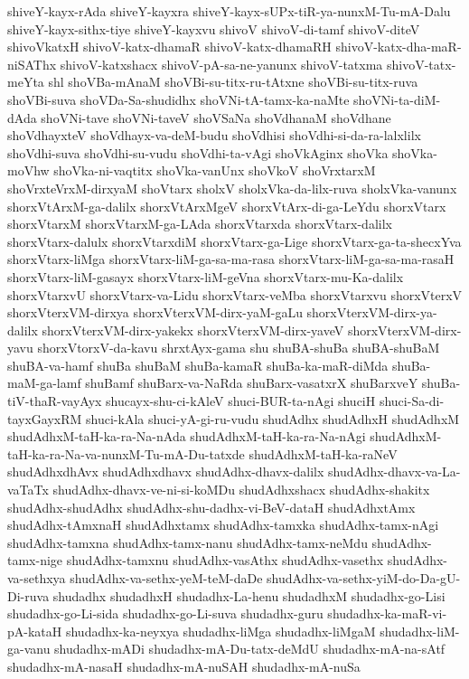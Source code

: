 {shiveY-kayx-rAda
shiveY-kayxra
shiveY-kayx-sUPx-tiR-ya-nunxM-Tu-mA-Dalu
shiveY-kayx-sithx-tiye
shiveY-kayxvu
shivoV
shivoV-di-tamf
shivoV-diteV
shivoVkatxH
shivoV-katx-dhamaR
shivoV-katx-dhamaRH
shivoV-katx-dha-maR-niSAThx
shivoV-katxshacx
shivoV-pA-sa-ne-yanunx
shivoV-tatxma
shivoV-tatx-meYta
shl
shoVBa-mAnaM
shoVBi-su-titx-ru-tAtxne
shoVBi-su-titx-ruva
shoVBi-suva
shoVDa-Sa-shudidhx
shoVNi-tA-tamx-ka-naMte
shoVNi-ta-diM-dAda
shoVNi-tave
shoVNi-taveV
shoVSaNa
shoVdhanaM
shoVdhane
shoVdhayxteV
shoVdhayx-va-deM-budu
shoVdhisi
shoVdhi-si-da-ra-lalxlilx
shoVdhi-suva
shoVdhi-su-vudu
shoVdhi-ta-vAgi
shoVkAginx
shoVka
shoVka-moVhw
shoVka-ni-vaqtitx
shoVka-vanUnx
shoVkoV
shoVrxtarxM
shoVrxteVrxM-dirxyaM
shoVtarx
sholxV
sholxVka-da-lilx-ruva
sholxVka-vanunx
shorxVtArxM-ga-dalilx
shorxVtArxMgeV
shorxVtArx-di-ga-LeYdu
shorxVtarx
shorxVtarxM
shorxVtarxM-ga-LAda
shorxVtarxda
shorxVtarx-dalilx
shorxVtarx-dalulx
shorxVtarxdiM
shorxVtarx-ga-Lige
shorxVtarx-ga-ta-shecxYva
shorxVtarx-liMga
shorxVtarx-liM-ga-sa-ma-rasa
shorxVtarx-liM-ga-sa-ma-rasaH
shorxVtarx-liM-gasayx
shorxVtarx-liM-geVna
shorxVtarx-mu-Ka-dalilx
shorxVtarxvU
shorxVtarx-va-Lidu
shorxVtarx-veMba
shorxVtarxvu
shorxVterxV
shorxVterxVM-dirxya
shorxVterxVM-dirx-yaM-gaLu
shorxVterxVM-dirx-ya-dalilx
shorxVterxVM-dirx-yakekx
shorxVterxVM-dirx-yaveV
shorxVterxVM-dirx-yavu
shorxVtorxV-da-kavu
shrxtAyx-gama
shu
shuBA-shuBa
shuBA-shuBaM
shuBA-va-hamf
shuBa
shuBaM
shuBa-kamaR
shuBa-ka-maR-diMda
shuBa-maM-ga-lamf
shuBamf
shuBarx-va-NaRda
shuBarx-vasatxrX
shuBarxveY
shuBa-tiV-thaR-vayAyx
shucayx-shu-ci-kAleV
shuci-BUR-ta-nAgi
shuciH
shuci-Sa-di-tayxGayxRM
shuci-kAla
shuci-yA-gi-ru-vudu
shudAdhx
shudAdhxH
shudAdhxM
shudAdhxM-taH-ka-ra-Na-nAda
shudAdhxM-taH-ka-ra-Na-nAgi
shudAdhxM-taH-ka-ra-Na-va-nunxM-Tu-mA-Du-tatxde
shudAdhxM-taH-ka-raNeV
shudAdhxdhAvx
shudAdhxdhavx
shudAdhx-dhavx-dalilx
shudAdhx-dhavx-va-La-vaTaTx
shudAdhx-dhavx-ve-ni-si-koMDu
shudAdhxshacx
shudAdhx-shakitx
shudAdhx-shudAdhx
shudAdhx-shu-dadhx-vi-BeV-dataH
shudAdhxtAmx
shudAdhx-tAmxnaH
shudAdhxtamx
shudAdhx-tamxka
shudAdhx-tamx-nAgi
shudAdhx-tamxna
shudAdhx-tamx-nanu
shudAdhx-tamx-neMdu
shudAdhx-tamx-nige
shudAdhx-tamxnu
shudAdhx-vasAthx
shudAdhx-vasethx
shudAdhx-va-sethxya
shudAdhx-va-sethx-yeM-teM-daDe
shudAdhx-va-sethx-yiM-do-Da-gU-Di-ruva
shudadhx
shudadhxH
shudadhx-La-henu
shudadhxM
shudadhx-go-Lisi
shudadhx-go-Li-sida
shudadhx-go-Li-suva
shudadhx-guru
shudadhx-ka-maR-vi-pA-kataH
shudadhx-ka-neyxya
shudadhx-liMga
shudadhx-liMgaM
shudadhx-liM-ga-vanu
shudadhx-mADi
shudadhx-mA-Du-tatx-deMdU
shudadhx-mA-na-sAtf
shudadhx-mA-nasaH
shudadhx-mA-nuSAH
shudadhx-mA-nuSa
}
